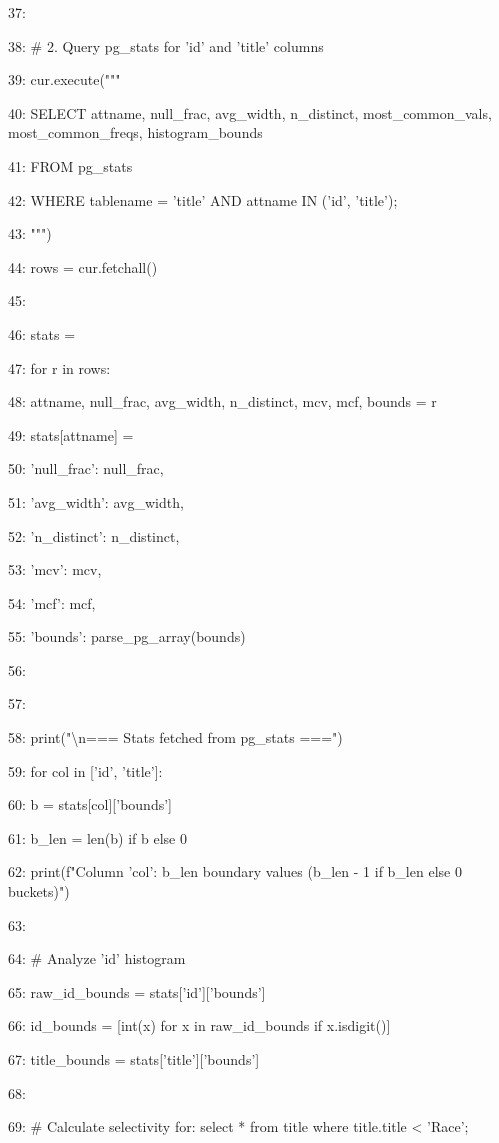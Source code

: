 \documentclass[11pt,a4paper]{article}
\begin{document}
{37:

38:     \# 2. Query pg\_stats for 'id' and 'title' columns

39:     cur.execute("""

40:         SELECT attname, null\_frac, avg\_width, n\_distinct, most\_common\_vals, most\_common\_freqs, histogram\_bounds

41:         FROM pg\_stats

42:         WHERE tablename = 'title' AND attname IN ('id', 'title');

43:     """)

44:     rows = cur.fetchall()

45:

46:     stats = {}

47:     for r in rows:

48:         attname, null\_frac, avg\_width, n\_distinct, mcv, mcf, bounds = r

49:         stats[attname] = {

50:             'null\_frac': null\_frac,

51:             'avg\_width': avg\_width,

52:             'n\_distinct': n\_distinct,

53:             'mcv': mcv,

54:             'mcf': mcf,

55:             'bounds': parse\_pg\_array(bounds)

56:         }

57:

58:     print("\textbackslash{}n=== Stats fetched from pg\_stats ===")

59:     for col in ['id', 'title']:

60:         b = stats[col]['bounds']

61:         b\_len = len(b) if b else 0

62:         print(f"Column '{col}': {b\_len} boundary values ({b\_len - 1 if b\_len else 0} buckets)")

63:

64:     \# Analyze 'id' histogram

65:     raw\_id\_bounds = stats['id']['bounds']

66:     id\_bounds = [int(x) for x in raw\_id\_bounds if x.isdigit()]

67:     title\_bounds = stats['title']['bounds']

68:

69:     \# Calculate selectivity for: select * from title where title.title < 'Race';

}
\end{document}

